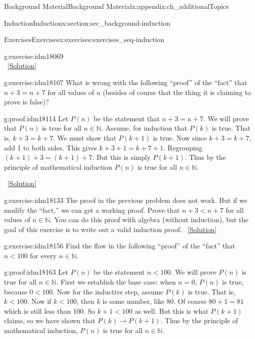 \documentclass[oneside,10pt,]{book}
\numberwithin{equation}{chapter}
\def\N{\mathbb N}
\def\imp{\rightarrow}
\newcommand{\lt}{<}
\begin{document}
\begin{appendixptx}{Background Material}{}{Background Material}{}{}{x:appendix:ch_additionalTopics}
\begin{sectionptx}{Induction}{}{Induction}{}{}{x:section:sec_background-induction}
\begin{exercises-subsection}{Exercises}{}{Exercises}{}{}{x:exercises:exercises_seq-induction}
\begin{divisionexercise}{9}{}{}{g:exercise:idm18069}
\begin{equation*}
\end{equation*}
%
\qquad~\hfill{\tiny\hyperlink{g:solution:idm18074-main}{[Solution]}}\end{divisionexercise}%
\begin{divisionexercise}{10}{}{}{g:exercise:idm18107}%
What is wrong with the following ``proof'' of the ``fact'' that \(n+3 = n+7\) for all values of \(n\) (besides of course that the thing it is claiming to prove is false)?%
\begin{proofptx}{}{g:proof:idm18114}
Let \(P(n)\) be the statement that \(n + 3 = n + 7\). We will prove that \(P(n)\) is true for all \(n \in \N\). Assume, for induction that \(P(k)\) is true. That is, \(k+3 = k+7\). We must show that \(P(k+1)\) is true. Now since \(k + 3 = k + 7\), add 1 to both sides. This gives \(k + 3 + 1 = k + 7 + 1\). Regrouping \((k+1) + 3 = (k+1) + 7\). But this is simply \(P(k+1)\). Thus by the principle of mathematical induction \(P(n)\) is true for all \(n \in \N\).%
\end{proofptx}
\qquad~\hfill{\tiny\hyperlink{g:solution:idm18129-main}{[Solution]}}\end{divisionexercise}%
\begin{divisionexercise}{11}{}{}{g:exercise:idm18133}%
The proof in the previous problem does not work. But if we modify the ``fact,'' we can get a working proof. Prove that \(n + 3 \lt  n + 7\) for all values of \(n \in \N\). You can do this proof with algebra (without induction), but the goal of this exercise is to write out a valid induction proof.%
\qquad~\hfill{\tiny\hyperlink{g:solution:idm18139-main}{[Solution]}}\end{divisionexercise}%
\begin{divisionexercise}{12}{}{}{g:exercise:idm18156}%
Find the flaw in the following ``proof'' of the ``fact'' that \(n \lt  100\) for every \(n \in \N\).%
\begin{proofptx}{}{g:proof:idm18163}
Let \(P(n)\) be the statement \(n \lt  100\). We will prove \(P(n)\) is true for all \(n \in \N\). First we establish the base case: when \(n = 0\), \(P(n)\) is true, because \(0 \lt  100\). Now for the inductive step, assume \(P(k)\) is true. That is, \(k \lt  100\). Now if \(k \lt  100\), then \(k\) is some number, like 80. Of course \(80+1 = 81\) which is still less than 100. So \(k +1 \lt  100\) as well. But this is what \(P(k+1)\) claims, so we have shown that \(P(k) \imp P(k+1)\). Thus by the principle of mathematical induction, \(P(n)\) is true for all \(n \in \N\).%
\end{proofptx}

\end{divisionexercise}
\end{exercises-subsection}
\end{sectionptx}
\end{appendixptx}
\end{document}
